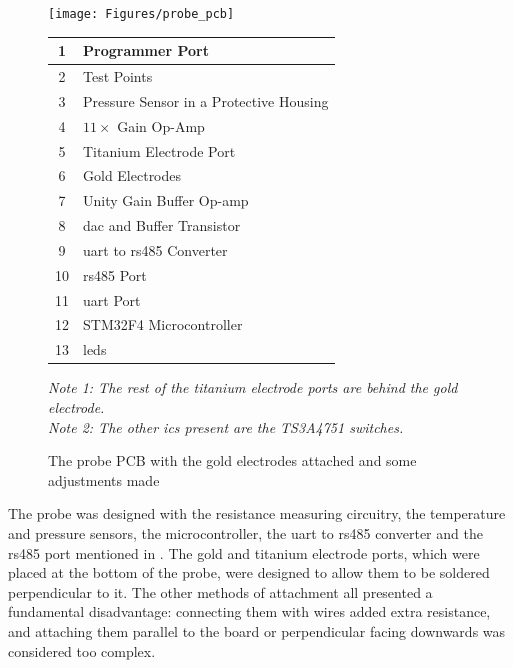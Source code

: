 \begin{figure}[ht]
    \begin{minipage}{0.5\textwidth}
        \centering
        \texttt{[image: Figures/probe\_pcb]}
    \end{minipage}
    \begin{minipage}{0.5\textwidth}
        \centering
        \begin{tabular}{cl} \hline
            1 & Programmer Port \\ \hline
            2 & Test Points \\ \hline
            3 & Pressure Sensor in a Protective Housing \\ \hline
            4 & $11\times$ Gain Op-Amp \\ \hline
            5 & Titanium Electrode Port \\ \hline
            6 & Gold Electrodes \\ \hline
            7 & Unity Gain Buffer Op-amp \\ \hline
            8 & \gls{dac} and Buffer Transistor \\ \hline
            9 & \gls{uart} to \gls{rs485} Converter \\ \hline
            10 & \gls{rs485} Port \\ \hline
            11 & \gls{uart} Port \\ \hline
            12 & STM32F4 Microcontroller \\ \hline
            13 & \glspl{led} \\ \hline
        \end{tabular}
    \end{minipage}
    \caption{The probe PCB with the gold electrodes attached and some adjustments made}
    \label{fig:probe-pcb} %
    \textit{Note 1: The rest of the titanium electrode ports are behind the gold electrode.} \\
    \textit{Note 2: The other \glspl{ic} present are the TS3A4751 switches.}
\end{figure}

The probe was designed with the resistance measuring circuitry, the temperature and pressure sensors, the microcontroller, the \gls{uart} to \gls{rs485} converter and the \gls{rs485} port mentioned in .
The gold and titanium electrode ports, which were placed at the bottom of the probe, were designed to allow them to be soldered perpendicular to it.
The other methods of attachment all presented a fundamental disadvantage: connecting them with wires added extra resistance, and attaching them parallel to the board or perpendicular facing downwards was considered too complex.

